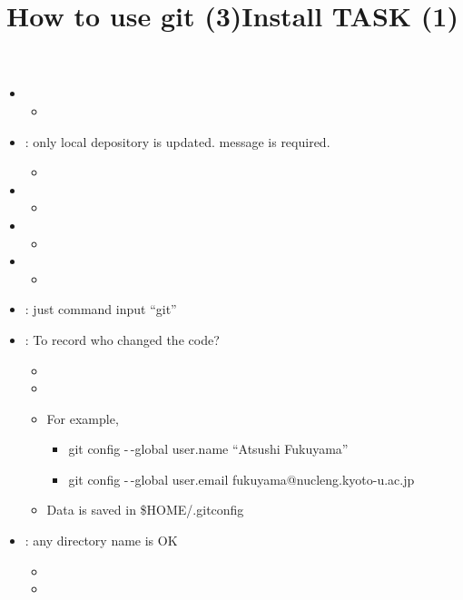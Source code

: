 \documentclass[12pt]{article}
\begin{document}
\title{How to use git (3)}
\begin{itemize}
\item
{}
\begin{itemize}
\item
{}
\end{itemize}
\item
{}: only local depository
is updated.  message is required.
\begin{itemize}
\item
{}
\end{itemize}
\item
{}
\begin{itemize}
\item
{}
\end{itemize}
\item
{}
\begin{itemize}
\item
{}
\end{itemize}
\item
{}
\begin{itemize}
\item
{}
\end{itemize}
\end{itemize}

\title{Install TASK (1)}
\begin{itemize}
\item
{}: just command input ``git''
\item
{}: To record who changed the code?
\begin{itemize}
\item
{}
\item
{}
\item
For example,
\begin{itemize}
\item
git config -\,-global user.name ``Atsushi Fukuyama''
\item
git config -\,-global user.email fukuyama@nucleng.kyoto-u.ac.jp
\end{itemize}
\item
Data is saved in \$HOME/.gitconfig
\end{itemize}
\item
{}: any directory name is OK
\begin{itemize}
\item
{}
\item
{}
\end{itemize}
\end{itemize}
\end{document}
